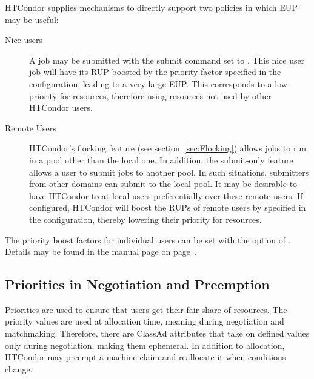 HTCondor supplies mechanisms to directly support two policies in which EUP may
be useful:
\begin{description}
	\item[Nice users]  A job may be submitted with the submit command 
	 set to .
	This nice user job will have its RUP boosted by the 
	 priority factor specified in the 
	configuration, leading to a very large EUP.
	This corresponds to a low priority for resources,
	therefore using resources not used by other HTCondor users.

	\item[Remote Users] HTCondor's flocking feature (see
	section~\ref{sec:Flocking}) allows jobs to run in a pool
        other than the local one.
	In addition, the submit-only feature allows a user 
	to submit jobs to another pool.
	In such situations, submitters from other domains
	can submit to the local pool.
	It may be desirable to have HTCondor treat local users
	preferentially over these remote users.
	If configured, HTCondor will boost the RUPs of remote users by
	specified in the configuration,
	thereby lowering their priority for resources.
\end{description}

The priority boost factors for individual users can be set with the 
 option of .
Details may be found in the  manual page 
on page~\pageref{man-condor-userprio}.


\subsection{Priorities in Negotiation and Preemption}
Priorities are used to ensure that users get their fair share of resources.  
The priority values are used at allocation time, meaning during
negotiation and matchmaking.
Therefore, there are ClassAd attributes that take on defined values
only during negotiation, making them ephemeral.
In addition to allocation, HTCondor may preempt a machine claim 
and reallocate it when conditions change.

